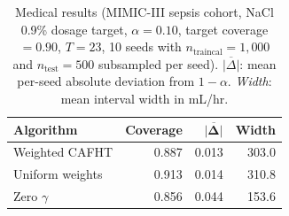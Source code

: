 \begin{table}[ht]
\centering
\small
\setlength{\tabcolsep}{8pt}
\renewcommand{\arraystretch}{1.15}
\caption{%
  Medical results (MIMIC-III sepsis cohort, NaCl 0.9\% dosage target, $\alpha=0.10$, target coverage $= 0.90$, $T = 23$, 10 seeds with $n_{\mathrm{traincal}} = 1{,}000$ and $n_{\mathrm{test}} = 500$ subsampled per seed). $\overline{|\Delta|}$: mean per-seed absolute deviation from $1-\alpha$. \textit{Width}: mean interval width in mL/hr.
}
\label{tab:medical}
\begin{tabular}{@{} lrrr @{}}
\toprule
{\bfseries Algorithm}  & {\bfseries Coverage} & $\boldsymbol{\overline{|\Delta|}}$ & {\bfseries Width} \\
\midrule
Weighted CAFHT     & 0.887 & 0.013 & 303.0 \\
Uniform weights    & 0.913 & 0.014 & 310.8 \\
Zero $\gamma$      & 0.856 & 0.044 & 153.6 \\
\bottomrule
\end{tabular}
\end{table}

